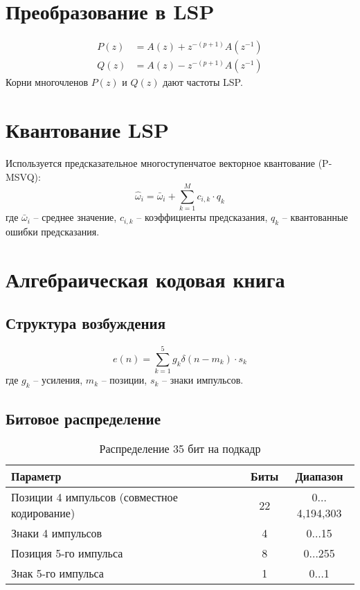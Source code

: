 \documentclass{report}
\begin{document}
	\section{Преобразование в LSP}
	\begin{align}
		P(z) &= A(z) + z^{-(p+1)}A(z^{-1}) \\
		Q(z) &= A(z) - z^{-(p+1)}A(z^{-1})
	\end{align}
	Корни многочленов $P(z)$ и $Q(z)$ дают частоты LSP.
	
	\section{Квантование LSP}
	Используется предсказательное многоступенчатое векторное квантование (P-MSVQ):
	\begin{equation}
		\hat{\omega}_i = \bar{\omega}_i + \sum_{k=1}^{M} c_{i,k} \cdot q_k
	\end{equation}
	где $\bar{\omega}_i$ -- среднее значение, $c_{i,k}$ -- коэффициенты предсказания, $q_k$ -- квантованные ошибки предсказания.
	
	\section{Алгебраическая кодовая книга}
	\subsection{Структура возбуждения}
	\begin{equation}
		e(n) = \sum_{k=1}^{5} g_k \delta(n - m_k) \cdot s_k
	\end{equation}
	где $g_k$ -- усиления, $m_k$ -- позиции, $s_k$ -- знаки импульсов.
	
	\subsection{Битовое распределение}
	\begin{table}[H]
		\centering
		\caption{Распределение 35 бит на подкадр}
		\begin{tabular}{lcc}
			\toprule
			\textbf{Параметр} & \textbf{Биты} & \textbf{Диапазон} \\
			\midrule
			Позиции 4 импульсов (совместное кодирование) & 22 & 0$\ldots$4,194,303 \\
			Знаки 4 импульсов & 4 & 0$\ldots$15 \\
			Позиция 5-го импульса & 8 & 0$\ldots$255 \\
			Знак 5-го импульса & 1 & 0$\ldots$1 \\
			\bottomrule
		\end{tabular}
	\end{table}
	
\end{document}

